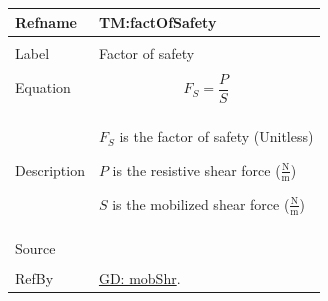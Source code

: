 \documentclass[12pt]{article}
\begin{document}
\noindent \begin{minipage}{\textwidth}
\begin{tabular}{p{} p{}}
\toprule \textbf{Refname} & \textbf{TM:factOfSafety}
\label{TM:factOfSafety}
\\ \midrule \\
Label & Factor of safety
        \\ \midrule \\
        Equation & \begin{displaymath}
                   {F_{S}}=\frac{P}{S}
                   \end{displaymath}
                   \\ \midrule \\
                   Description & \begin{symbDescription}
                                 \item{${F_{S}}$ is the factor of safety (Unitless)}
                                 \item{$P$ is the resistive shear force ($\frac{\text{N}}{\text{m}}$)}
                                 \item{$S$ is the mobilized shear force ($\frac{\text{N}}{\text{m}}$)}
                                 \end{symbDescription}
                                 \\ \midrule \\
                                 Source & \cite{fredlund1977}
                                          \\ \midrule \\
                                          RefBy & \hyperref[GD:mobShr]{GD: mobShr}.
\\ \bottomrule \end{tabular}
\end{minipage}
\par~
\end{document}

